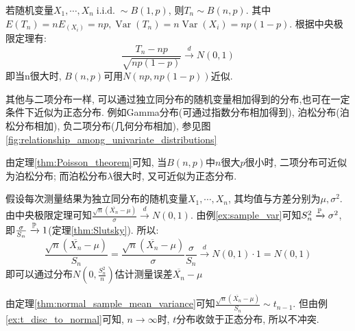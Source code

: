 \begin{example}[二项分布近似为正态分布]
    若随机变量$X_1,\cdots ,X_n \operatorname{i.i.d.} \sim B(1,p)$, 则$T_n \sim B(n,p)$. 其中$E(T_n)=nE_(X_i)=np, \operatorname{Var}(T_n)=n\operatorname{Var}(X_i)=np(1-p)$. 根据中央极限定理有:
    \[ \frac{T_n - np}{\sqrt{np(1-p)}} \xrightarrow{d} N(0,1) \]
    即当n很大时, $B(n,p)$可用$N(np,np(1-p))$近似.
\end{example}
\begin{remark}
    其他与二项分布一样, 可以通过独立同分布的随机变量相加得到的分布,也可在一定条件下近似为正态分布. 例如Gamma分布(可通过指数分布相加得到), 泊松分布(泊松分布相加), 负二项分布(几何分布相加), 参见图\ref{fig:relationship_among_univariate_distributions}
\end{remark}
\begin{remark}
    由定理\ref{thm:Poisson_theorem}可知, 当$B(n,p)$中$n$很大$p$很小时, 二项分布可近似为泊松分布; 而泊松分布$\lambda$很大时, 又可近似为正态分布.
\end{remark}

\begin{example}[测量误差估计]
    假设每次测量结果为独立同分布的随机变量$X_1,\cdots ,X_n$, 其均值与方差分别为$\mu,\sigma^2$. 由中央极限定理可知$\frac{\sqrt{n}(\overline{X_n}-\mu)}{\sigma} \xrightarrow{d} N(0,1)$. 由例\ref{ex:sample_var}可知$S_n^2 \xrightarrow{\P} \sigma^2$, 即$\frac{\sigma}{S_n} \xrightarrow{\P} 1$(定理\ref{thm:Slutsky}). 所以:
    \[ \frac{\sqrt{n}(\overline{X_n}-\mu)}{S_n}=\frac{\sqrt{n}(\overline{X_n}-\mu)}{\sigma}\frac{\sigma}{S_n} \xrightarrow{d} N(0,1)\cdot 1=N(0,1) \]
    即可以通过分布$N(0,\frac{S_n^2}{n})$估计测量误差$\overline{X_n}-\mu$
\end{example}
\begin{remark}
    由定理\ref{thm:normal_sample_mean_variance}可知$\frac{\sqrt{n}(\overline{X_n}-\mu)}{S_n} \sim t_{n-1}$. 但由例\ref{ex:t_disc_to_normal}可知, $n\to \infty$时, $t$分布收敛于正态分布, 所以不冲突.
\end{remark}